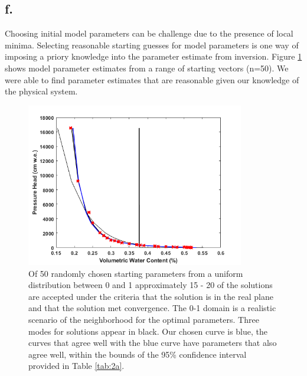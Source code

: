 \documentclass{article}
\begin{document}
\subsection{f.}
Choosing initial model parameters can be challenge due to the presence of local minima. Selecting reasonable starting guesses for model parameters is one way of imposing a priory knowledge into the parameter estimate from inversion. Figure \ref{fig:2f} shows model parameter estimates from a range of starting vectors (n=50). We were able to find parameter estimates that are reasonable given our knowledge of the physical system. 


\begin{figure}
    \centering
    \includegraphics[width=0.85\textwidth]{2f.png}
    \caption{Of 50 randomly chosen starting parameters from a uniform distribution between 0 and 1 approximately 15 - 20 of the solutions are accepted under the criteria that the solution is in the real plane and that the solution met convergence. The 0-1 domain is a realistic scenario of the neighborhood for the optimal parameters. Three modes for solutions appear in black. Our chosen curve is blue, the curves that agree well with the blue curve have parameters that also agree well, within the bounds of the 95\% confidence interval provided in Table \ref{tab:2a}. }
    \label{fig:2f}
\end{figure}
\end{document}
